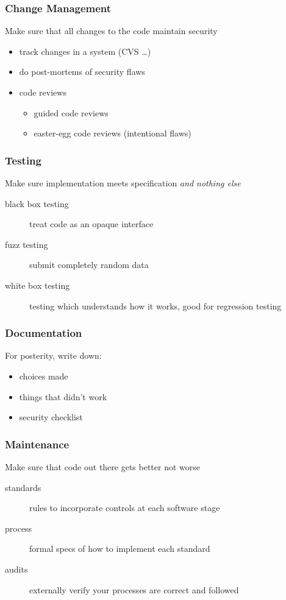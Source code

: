 \documentclass[]{article}
\theoremstyle{definition}
\begin{document}
	\subsubsection{Change Management}
	Make sure that all changes to the code maintain security
	\begin{itemize}
		\item track changes in a system (CVS \dots)
		\item do post-mortems of security flaws
		\item code reviews
			\begin{itemize}
				\item guided code reviews
				\item easter-egg code reviews (intentional flaws)
			\end{itemize}
	\end{itemize}

	\subsubsection{Testing}
	Make sure implementation meets specification \textit{and nothing else}
	\begin{description}
		\item[black box testing] treat code as an opaque interface
		\item[fuzz testing] submit completely random data
		\item[white box testing] testing which understands how it works, good for regression testing
	\end{description}

	\subsubsection{Documentation}
	For posterity, write down:
	\begin{itemize}
		\item choices made
		\item things that didn't work
		\item security checklist
	\end{itemize}

	\subsubsection{Maintenance}
	Make sure that code out there gets better not worse
	\begin{description}
		\item[standards] rules to incorporate controls at each software stage
		\item[process] formal specs of how to implement each standard
		\item[audits] externally verify your processes are correct and followed
	\end{description}
\end{document}
